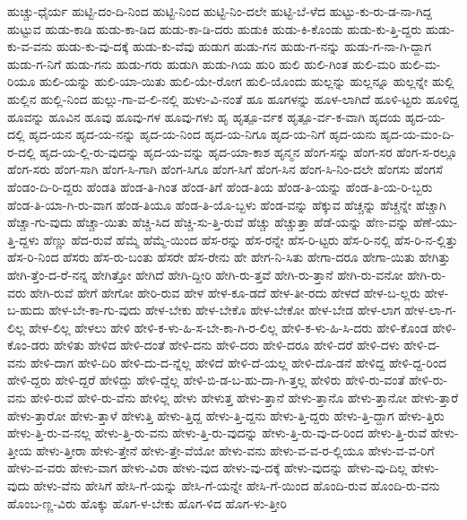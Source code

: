 {ಹುಚ್ಚು-ಧೈರ್ಯ
ಹುಟ್ಟಿ-ದಂ-ದಿ-ನಿಂದ
ಹುಟ್ಟಿ-ನಿಂದ
ಹುಟ್ಟಿ-ನಿಂ-ದಲೇ
ಹುಟ್ಟಿ-ಬೆ-ಳೆದ
ಹುಟ್ಟು-ಕು-ರು-ಡ-ನಾ-ಗಿದ್ದ
ಹುಟ್ಟುವ
ಹುಡು-ಕಾಡಿ
ಹುಡು-ಕಾ-ಡಿದ
ಹುಡು-ಕಾ-ಡಿ-ದರು
ಹುಡುಕಿ
ಹುಡು-ಕಿ-ಕೊಂಡು
ಹುಡು-ಕು-ತ್ತಿ-ದ್ದರು
ಹುಡು-ಕು-ವ-ವನು
ಹುಡು-ಕು-ವು-ದಕ್ಕೆ
ಹುಡು-ಕು-ವೆವು
ಹುಡುಗ
ಹುಡು-ಗನ
ಹುಡು-ಗ-ನನ್ನು
ಹುಡು-ಗ-ನಾ-ಗಿ-ದ್ದಾಗ
ಹುಡು-ಗ-ನಿಗೆ
ಹುಡು-ಗನು
ಹುಡು-ಗರು
ಹುಡುಗಿ
ಹುಡು-ಗಿಯ
ಹುರಿ
ಹುಲಿ
ಹುಲಿ-ಗಿಂತ
ಹುಲಿ-ಮರಿ
ಹುಲಿ-ಮ-ರಿಯೂ
ಹುಲಿ-ಯನ್ನು
ಹುಲಿ-ಯಾ-ಯಿತು
ಹುಲಿ-ಯೇ-ರೋಗ
ಹುಲಿ-ಯೊಂದು
ಹುಲ್ಲನ್ನು
ಹುಲ್ಲನ್ನೂ
ಹುಲ್ಲನ್ನೇ
ಹುಲ್ಲಿ
ಹುಲ್ಲಿನ
ಹುಲ್ಲಿ-ನಿಂದ
ಹುಲ್ಲು-ಗಾ-ವ-ಲಿ-ನಲ್ಲಿ
ಹುಳು-ವಿ-ನಂತೆ
ಹೂ
ಹೂಗಳನ್ನು
ಹೂಳ-ಲಾಗಿದೆ
ಹೂಳಿ-ಟ್ಟರು
ಹೂಳಿದ್ದ
ಹೂವನ್ನು
ಹೂವಿನ
ಹೂವು
ಹೂವು-ಗಳ
ಹೂವು-ಗಳು
ಹೃ
ಹೃತ್ಪೂ-ರ್ವಕ
ಹೃತ್ಪೂ-ರ್ವ-ಕ-ವಾಗಿ
ಹೃದಯ
ಹೃದ-ಯ-ದಲ್ಲಿ
ಹೃದ-ಯನ
ಹೃದ-ಯ-ನನ್ನು
ಹೃದ-ಯ-ನಿಂದ
ಹೃದ-ಯ-ನಿಗೂ
ಹೃದ-ಯ-ನಿಗೆ
ಹೃದ-ಯನು
ಹೃದ-ಯ-ಮಂ-ದಿ-ರ-ದಲ್ಲಿ
ಹೃದ-ಯ-ಲ್ಲಿ-ರು-ವುದನ್ನು
ಹೃದ-ಯ-ವನ್ನು
ಹೃದ-ಯಾ-ಕಾಶ
ಹೃನ್ಮನ
ಹೆಂಗ-ಸನ್ನು
ಹೆಂಗ-ಸರ
ಹೆಂಗ-ಸ-ರಲ್ಲೂ
ಹೆಂಗ-ಸರು
ಹೆಂಗ-ಸಾಗಿ
ಹೆಂಗ-ಸಿ-ಗಾಗಿ
ಹೆಂಗ-ಸಿಗೂ
ಹೆಂಗ-ಸಿಗೆ
ಹೆಂಗ-ಸಿನ
ಹೆಂಗ-ಸಿ-ನಿಂ-ದಲೇ
ಹೆಂಗಸು
ಹೆಂಗಸೆ
ಹೆಂಡಂ-ದಿ-ರಿ-ದ್ದರು
ಹೆಂಡತಿ
ಹೆಂಡ-ತಿ-ಗಿಂತ
ಹೆಂಡ-ತಿಗೆ
ಹೆಂಡ-ತಿಯ
ಹೆಂಡ-ತಿ-ಯನ್ನು
ಹೆಂಡ-ತಿ-ಯ-ರಿ-ಬ್ಬರು
ಹೆಂಡ-ತಿ-ಯಾ-ಗಿ-ರು-ವಾಗ
ಹೆಂಡ-ತಿಯೂ
ಹೆಂಡ-ತಿ-ಯೊ-ಬ್ಬಳು
ಹೆಂಡ-ವನ್ನು
ಹೆಕ್ಕುವ
ಹೆಚ್ಚನ್ನು
ಹೆಚ್ಚನ್ನೇ
ಹೆಚ್ಚಾಗಿ
ಹೆಚ್ಚಾ-ಗು-ವುದು
ಹೆಚ್ಚಾ-ಯಿತು
ಹೆಚ್ಚಿ-ಸಿದ
ಹೆಚ್ಚಿ-ಸು-ತ್ತಿ-ರುವೆ
ಹೆಚ್ಚು
ಹೆಚ್ಚುತ್ತಾ
ಹೆಡೆ-ಯನ್ನು
ಹೆಣ-ವನ್ನು
ಹೆಣೆ-ಯು-ತ್ತಿ-ದ್ದಳು
ಹೆಣ್ಣು
ಹೆದ-ರುವೆ
ಹೆಮ್ಮೆ
ಹೆಮ್ಮೆ-ಯಿಂದ
ಹೆಸ-ರನ್ನು
ಹೆಸ-ರನ್ನೇ
ಹೆಸ-ರಿ-ಟ್ಟರು
ಹೆಸ-ರಿ-ನಲ್ಲಿ
ಹೆಸ-ರಿ-ನ-ಲ್ಲಿತ್ತು
ಹೆಸ-ರಿ-ನಿಂದ
ಹೆಸರು
ಹೆಸ-ರು-ಬಂತು
ಹೆಸರೇ
ಹೆಸ-ರೇನು
ಹೇ
ಹೇಗ-ನಿ-ಸಿತು
ಹೇಗಾ-ದರೂ
ಹೇಗಾ-ಯಿತು
ಹೇಗಿತ್ತು
ಹೇಗಿ-ತ್ತೆಂ-ದ-ರೆ-ನನ್ನ
ಹೇಗಿತ್ತೋ
ಹೇಗಿದೆ
ಹೇಗಿ-ದ್ದೀರಿ
ಹೇಗಿ-ರು-ತ್ತವೆ
ಹೇಗಿ-ರು-ತ್ತಾನೆ
ಹೇಗಿ-ರು-ವನೋ
ಹೇಗಿ-ರು-ವರು
ಹೇಗಿ-ರುವೆ
ಹೇಗೆ
ಹೇಗೋ
ಹೇರಿ-ರುವ
ಹೇಳ
ಹೇಳ-ಕೂ-ಡದೆ
ಹೇಳ-ತೀ-ರದು
ಹೇಳದೆ
ಹೇಳ-ಬ-ಲ್ಲರು
ಹೇಳ-ಬ-ಹುದು
ಹೇಳ-ಬೇ-ಕಾ-ಗು-ವುದು
ಹೇಳ-ಬೇಕು
ಹೇಳ-ಬೇಕೊ
ಹೇಳ-ಬೇಕೋ
ಹೇಳ-ಬೇಡ
ಹೇಳ-ಲಾಗ
ಹೇಳ-ಲಾ-ಗ-ಲಿಲ್ಲ
ಹೇಳ-ಲಿಲ್ಲ
ಹೇಳಲು
ಹೇಳಿ
ಹೇಳಿ-ಕ-ಳು-ಹಿ-ಸ-ಬೇ-ಕಾ-ಗಿ-ರ-ಲಿಲ್ಲ
ಹೇಳಿ-ಕ-ಳು-ಹಿ-ಸಿ-ದರು
ಹೇಳಿ-ಕೊಂಡ
ಹೇಳಿ-ಕೊಂ-ಡರು
ಹೇಳಿತು
ಹೇಳಿದ
ಹೇಳಿ-ದಂತೆ
ಹೇಳಿ-ದನು
ಹೇಳಿ-ದರು
ಹೇಳಿ-ದರೂ
ಹೇಳಿ-ದರೆ
ಹೇಳಿ-ದಳು
ಹೇಳಿ-ದ-ವನು
ಹೇಳಿ-ದಾಗ
ಹೇಳಿ-ದಿರಿ
ಹೇಳಿ-ದು-ದ-ನ್ನೆಲ್ಲ
ಹೇಳಿದೆ
ಹೇಳಿ-ದೆ-ಯಲ್ಲ
ಹೇಳಿ-ದೊ-ಡನೆ
ಹೇಳಿದ್ದ
ಹೇಳಿ-ದ್ದ-ರಿಂದ
ಹೇಳಿ-ದ್ದರು
ಹೇಳಿ-ದ್ದರೆ
ಹೇಳಿದ್ದು
ಹೇಳಿ-ದ್ದೆಲ್ಲ
ಹೇಳಿ-ಬಿ-ಡ-ಬ-ಹು-ದಾ-ಗಿ-ತ್ತಲ್ಲ
ಹೇಳಿರು
ಹೇಳಿ-ರು-ವಂತೆ
ಹೇಳಿ-ರು-ವನು
ಹೇಳಿ-ರುವೆ
ಹೇಳಿ-ರು-ವೆನು
ಹೇಳಿಲ್ಲ
ಹೇಳು
ಹೇಳುತ್ತ
ಹೇಳು-ತ್ತಾನೆ
ಹೇಳು-ತ್ತಾನೊ
ಹೇಳು-ತ್ತಾನೋ
ಹೇಳು-ತ್ತಾರೆ
ಹೇಳು-ತ್ತಾರೋ
ಹೇಳು-ತ್ತಾಳೆ
ಹೇಳುತ್ತಿ
ಹೇಳು-ತ್ತಿದ್ದ
ಹೇಳು-ತ್ತಿ-ದ್ದನು
ಹೇಳು-ತ್ತಿ-ದ್ದರು
ಹೇಳು-ತ್ತಿ-ದ್ದಾಗ
ಹೇಳು-ತ್ತಿರು
ಹೇಳು-ತ್ತಿ-ರು-ವ-ನಲ್ಲ
ಹೇಳು-ತ್ತಿ-ರು-ವನು
ಹೇಳು-ತ್ತಿ-ರು-ವುದನ್ನು
ಹೇಳು-ತ್ತಿ-ರು-ವು-ದ-ರಿಂದ
ಹೇಳು-ತ್ತಿ-ರುವೆ
ಹೇಳು-ತ್ತೀಯ
ಹೇಳು-ತ್ತೀರಾ
ಹೇಳು-ತ್ತೇನೆ
ಹೇಳು-ತ್ತೇ-ವೆಯೋ
ಹೇಳು-ವನು
ಹೇಳು-ವ-ವ-ರ-ಲ್ಲಿಯೂ
ಹೇಳು-ವ-ವ-ರಿಗೆ
ಹೇಳು-ವ-ವರು
ಹೇಳು-ವಾಗ
ಹೇಳು-ವಿರಾ
ಹೇಳು-ವುದ
ಹೇಳು-ವು-ದಕ್ಕೆ
ಹೇಳು-ವುದನ್ನು
ಹೇಳು-ವು-ದಿಲ್ಲ
ಹೇಳು-ವುದು
ಹೇಳು-ವೆನು
ಹೇಸಿಗೆ
ಹೇಸಿ-ಗೆ-ಯನ್ನು
ಹೇಸಿ-ಗೆ-ಯನ್ನೇ
ಹೇಸಿ-ಗೆ-ಯಿಂದ
ಹೊಂದಿ-ರುವ
ಹೊಂದಿ-ರು-ವನು
ಹೊಂಬ-ಣ್ಣ-ವಿರು
ಹೊಕ್ಕು
ಹೊಗ-ಳ-ಬೇಕು
ಹೊಗ-ಳಿದ
ಹೊಗ-ಳು-ತ್ತೀರಿ
}
